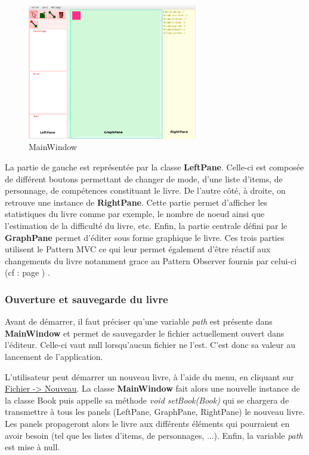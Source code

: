 			\begin{figure}[H]
				\centering\includegraphics[width=0.66\textwidth]{img/mainwindow.png}
				\caption{MainWindow}
				\label{fig:MainWindow}
			\end{figure}

			La partie de gauche est représentée par la classe \textbf{LeftPane}. Celle-ci est composée de différent boutons permettant de changer de mode, d'une liste d'items, de personnage, de compétences constituant le livre. De l'autre côté, à droite, on retrouve une instance de \textbf{RightPane}. Cette partie permet d'afficher les statistiques du livre comme par exemple, le nombre de noeud ainsi que l'estimation de la difficulté du livre, etc. Enfin, la partie centrale défini par le \textbf{GraphPane} permet d'éditer sous forme graphique le livre. Ces trois parties utilisent le Pattern MVC ce qui leur permet également d'être réactif aux changements du livre notamment grace au Pattern Observer fournis par celui-ci (cf :  page \pageref{subsec:pattern_observer}) .

			\subsubsection{Ouverture et sauvegarde du livre}

				Avant de démarrer, il faut préciser qu'une variable \textit{path} est présente dans \textbf{MainWindow} et permet de sauvegarder le fichier actuellement ouvert dans l'éditeur. Celle-ci vaut null lorsqu'aucun fichier ne l'est. C'est donc sa valeur au lancement de l'application.

				L'utilisateur peut démarrer un nouveau livre, à l'aide du menu, en cliquant sur \underline{Fichier -> Nouveau}. La classe \textbf{MainWindow} fait alors une nouvelle instance de la classe Book puis appelle sa méthode \textit{void setBook(Book)} qui se chargera de transmettre à tous les panels (LeftPane, GraphPane, RightPane) le nouveau livre. Les panels propageront alors le livre aux différents éléments qui pourraient en avoir besoin (tel que les listes d'items, de personnages, ...). Enfin, la variable \textit{path} est mise à null.

